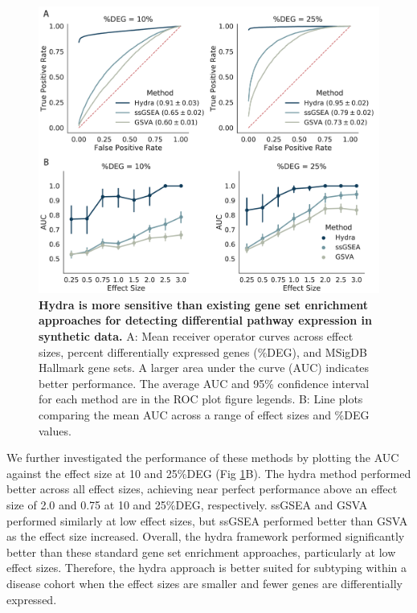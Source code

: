 \documentclass[10pt,letterpaper]{article}
\begin{document}
\begin{figure}[!h]
	\includegraphics[width=\textwidth]{img/PNG/ROC-PLOT-2x}
	\caption{{\bf Hydra is more sensitive than existing gene set enrichment approaches for detecting differential pathway expression in synthetic data.}
		A: Mean receiver operator curves across effect sizes, percent differentially expressed genes (\%DEG), and MSigDB Hallmark gene sets. A larger area under the curve (AUC) indicates better performance. The average AUC and 95\% confidence interval for each method are in the ROC plot figure legends. B: Line plots comparing the mean AUC across a range of effect sizes and \%DEG values.
		\label{rocplot}}
\end{figure}

We further investigated the performance of these methods by plotting the AUC against the effect size at 10 and 25\%DEG (Fig \ref{rocplot}B). The hydra method performed better across all effect sizes, achieving near perfect performance above an effect size of 2.0 and 0.75 at 10 and 25\%DEG, respectively. ssGSEA and GSVA performed similarly at low effect sizes, but ssGSEA performed better than GSVA as the effect size increased. Overall, the hydra framework performed significantly better than these standard gene set enrichment approaches, particularly at low effect sizes. Therefore, the hydra approach is better suited for subtyping within a disease cohort when the effect sizes are smaller and fewer genes are differentially expressed.
\end{document}
